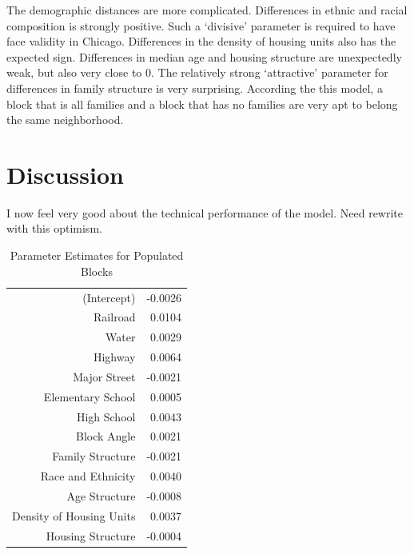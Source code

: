 \documentclass[12pt,letter]{article}\usepackage[]{graphicx}\usepackage[]{color}
\begin{document}
The demographic distances are more complicated. Differences in ethnic
and racial composition is strongly positive. Such a `divisive'
parameter is required to have face validity in Chicago. Differences in
the density of housing units also has the expected sign. Differences
in median age and housing structure are unexpectedly weak, but also
very close to 0. The relatively strong `attractive' parameter for
differences in family structure is very surprising. According the this
model, a block that is all families and a block that has no families
are very apt to belong the same neighborhood. 

\section*{Discussion}
I now feel very good about the technical performance of the
model. Need rewrite with this optimism.



\begin{table}[ht]
\centering
\begin{tabular}{rr}
  \hline
 &  \\ 
  \hline
(Intercept) & -0.0026 \\ 
  Railroad & 0.0104 \\ 
  Water & 0.0029 \\ 
  Highway & 0.0064 \\ 
  Major Street & -0.0021 \\ 
  Elementary School & 0.0005 \\ 
  High School & 0.0043 \\ 
  Block Angle & 0.0021 \\ 
  Family Structure & -0.0021 \\ 
  Race and Ethnicity & 0.0040 \\ 
  Age Structure & -0.0008 \\ 
  Density of Housing Units & 0.0037 \\ 
  Housing Structure & -0.0004 \\ 
   \hline
\end{tabular}
\caption{Parameter Estimates for Populated Blocks} 
\label{tab:parameters}
\end{table}







\end{document}
